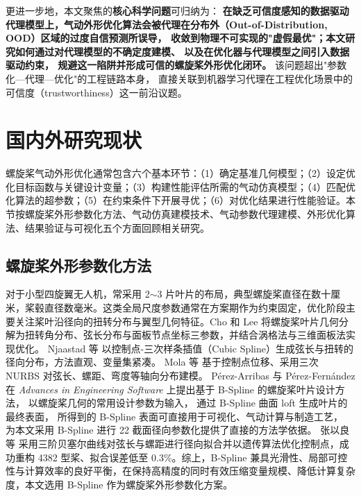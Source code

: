 \smallskip

更进一步地，本文聚焦的\textbf{核心科学问题}可归纳为：
\textbf{在缺乏可信度感知的数据驱动代理模型上，气动外形优化算法会被代理在分布外（Out-of-Distribution, OOD）区域的过度自信预测所误导，
收敛到物理不可实现的"虚假最优"；本文研究如何通过对代理模型的不确定度建模、
以及在优化器与代理模型之间引入数据驱动约束，
规避这一陷阱并形成可信的螺旋桨外形优化闭环。}
该问题超出"参数化—代理—优化"的工程链路本身，
直接关联到机器学习代理在工程优化场景中的可信度（trustworthiness）这一前沿议题。

\section{国内外研究现状}

螺旋桨气动外形优化通常包含六个基本环节：（1）确定基准几何模型；（2）设定优化目标函数与关键设计变量；（3）构建性能评估所需的气动仿真模型；（4）匹配优化算法的超参数；（5）在约束条件下开展寻优；（6）对优化结果进行性能验证。本节按螺旋桨外形参数化方法、气动仿真建模技术、气动参数代理建模、外形优化算法、结果验证与可视化五个方面回顾相关研究。

\subsection{螺旋桨外形参数化方法}

对于小型四旋翼无人机，常采用 2$\sim$3 片叶片的布局，典型螺旋桨直径在数十厘米，桨毂直径数毫米。这类全局尺度参数通常在方案期作为约束固定，优化阶段主要关注桨叶沿径向的扭转分布与翼型几何特征。Cho 和 Lee\cite{Cho1995} 将螺旋桨叶片几何分解为扭转角分布、弦长分布与面板节点坐标三参数，并结合涡格法与三维面板法实现优化。
Njaastad 等\cite{Njaastad2022} 以控制点-三次样条插值（Cubic Spline）生成弦长与扭转的径向分布，方法直观、变量集紧凑。
Mola 等\cite{Mola2019} 基于控制点位移、采用三次 NURBS 对弦长、螺距、弯度等轴向分布建模。
Pérez-Arribas 与 Pérez-Fernández\cite{PerezArribas2018} 在 \emph{Advances in Engineering Software} 上提出基于 B-Spline 的螺旋桨叶片设计方法，
以螺旋桨几何的常用设计参数为输入，
通过 B-Spline 曲面 loft 生成叶片的最终表面，
所得到的 B-Spline 表面可直接用于可视化、气动计算与制造工艺，
为本文采用 B-Spline 进行 22 截面径向参数化提供了直接的方法学依据。
张以良等\cite{Zhang2015chinese} 采用三阶贝塞尔曲线对弦长与螺距进行径向拟合并以遗传算法优化控制点，成功重构 4382 型桨、拟合误差低至 0.3\%。综上，B-Spline 兼具光滑性、局部可控性与计算效率的良好平衡，在保持高精度的同时有效压缩变量规模、降低计算复杂度，本文选用 B-Spline 作为螺旋桨外形参数化方案。

